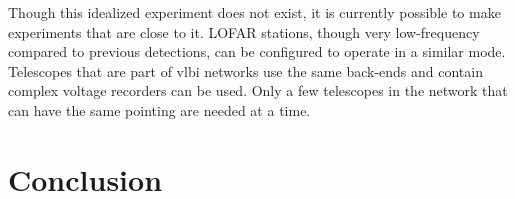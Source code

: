 \documentclass[a4paper,fleqn,usenatbib]{mnras}
\begin{document}
Though this idealized experiment does not exist, it is currently possible to
make experiments that are close to it. LOFAR stations, though very low-frequency
compared to previous detections, can be configured to operate in a similar mode.
Telescopes that are part of \gls{vlbi} networks use the same back-ends and
contain complex voltage recorders can be used. Only a few telescopes in the
network that can have the same pointing are needed at a time.

\section{Conclusion}

%
%
%
%
%
\end{document}
